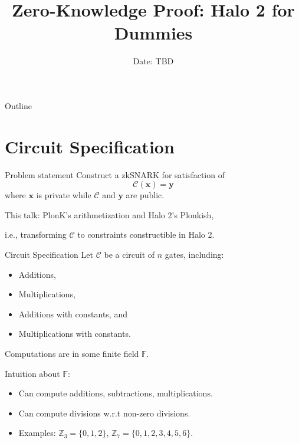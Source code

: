 \documentclass{beamer}
\title{Zero-Knowledge Proof: Halo 2 for Dummies}
\date{Date: TBD}
\begin{document}
	\begin{frame}
		\titlepage
	\end{frame}
	
	\begin{frame}{Outline}
		\tableofcontents
	\end{frame}

	\section{Circuit Specification}
	\begin{frame}{Problem statement}
		Construct a zkSNARK for satisfaction of 
		\begin{equation*}
			\mathcal{C}(\mathbf{x}) = \mathbf{y}
		\end{equation*}
		where $\mathbf{x}$ is private while $\mathcal{C}$ and $\mathbf{y}$ are public.
		
		This talk: PlonK's arithmetization \cite{iacr/GabizonWC19} and Halo 2's Plonkish, 
		
		i.e., transforming $\mathcal{C}$ to constraints constructible in Halo 2.
	\end{frame}

	\begin{frame}{Circuit Specification}
		Let $\mathcal{C}$ be a circuit of $n$ gates, including:
		\begin{itemize}
			\item Additions,
			\item Multiplications,
			\item Additions with constants, and 
			\item Multiplications with constants.
		\end{itemize}
		Computations are in some finite field $\mathbb{F}$.
		
		Intuition about $\mathbb{F}$:
		\begin{itemize}
			\item Can compute additions, subtractions, multiplications.
			\item Can compute divisions w.r.t non-zero divisions.
			\item Examples: $\mathbb{Z}_3 = \{0, 1, 2\}$, $\mathbb{Z}_7 = \{0, 1, 2, 3, 4, 5, 6\}$.
		\end{itemize}
	\end{frame}
\end{document}

